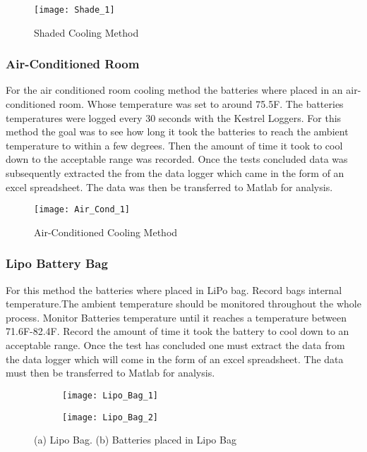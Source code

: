 \documentclass[12pt]{article}
\begin{document}
\begin{figure}[H]
	\centering
	\texttt{[image: Shade\_1]}
	\caption{Shaded Cooling Method}
	\label{fig:Shade}
\end{figure}



\subsubsection{Air-Conditioned Room}

For the air conditioned room cooling method the batteries where placed in an air-conditioned room. Whose temperature was set to around 75.5\degree F. The batteries temperatures were logged every 30 seconds with the Kestrel Loggers. For this method the goal was to see how long it took the batteries to reach the ambient temperature to within a few degrees. Then the amount of time it took to cool down to the acceptable range was recorded. Once the tests concluded data was subsequently extracted the from the data logger which came in the form of an excel spreadsheet. The data was then be transferred to Matlab for analysis. 

\begin{figure}[H]
	\centering
	\texttt{[image: Air\_Cond\_1]}
	\caption{Air-Conditioned Cooling Method}
	\label{fig:Air-Conditioned}
\end{figure}


\subsubsection{Lipo Battery Bag}

For this method the batteries where placed in LiPo bag. Record bags internal temperature.The ambient temperature should be monitored throughout the whole process. Monitor Batteries temperature until it reaches a temperature between 71.6\degree F-82.4\degree F. Record the amount of time it took the battery to cool down to an acceptable range.	Once the test has concluded one must extract the data from the data logger which will come in the form of an excel spreadsheet. The data must then be transferred to Matlab for analysis.

\begin{figure}
\centering
\begin{subfigure}[b]{0.45\textwidth}
\centering
\texttt{[image: Lipo\_Bag\_1]}
\caption{}
\label{fig: Lipo Bag 1}
\end{subfigure}
\hfill
\begin{subfigure}[b]{0.45\textwidth}
\centering
\texttt{[image: Lipo\_Bag\_2]}
\caption{}
\label{fig: Lipo Bag 2}
\end{subfigure}
\caption{(a) Lipo Bag. (b) Batteries placed in Lipo Bag}
\label{Two Lipo Bag Images}
\end{figure}
\end{document}
